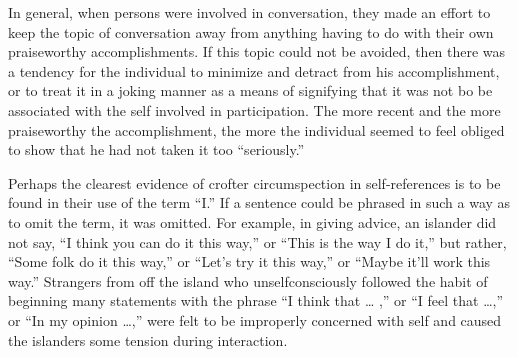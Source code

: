 \documentclass[twoside,symmetric,nobib,justified]{tufte-book}
\begin{document}
In general, when persons were involved in conversation, they made an
effort to keep the topic of conversation away from anything having to do
with their own praiseworthy accomplishments. If this topic could not be
avoided, then there was a tendency for the individual to minimize and
detract from his accomplishment, or to treat it in a joking manner as a
means of signifying that it was not bo be associated with the self
involved in participation. The more recent and the more praiseworthy the
accomplishment, the more the individual seemed to feel obliged to show
that he had not taken it too ``seriously.''

Perhaps the clearest evidence of crofter circumspection in
self-references is to be found in their use of the term ``I.'' If a
sentence could be phrased in such a way as to omit the term, it was
omitted. For example, in giving advice, an islander did not say, ``I
think you can do it this way,'' or ``This is the way I do it,'' but
rather, ``Some folk do it this way,'' or ``Let's try it this way,'' or
``Maybe it'll work this way.'' Strangers from off the island who
unselfconsciously followed the habit of beginning many statements with
the phrase ``I think that \ldots{} ,'' or ``I feel that \ldots,'' or
``In my opinion \ldots,'' were felt to be improperly concerned with self
and caused the islanders some tension during interaction.

\enlargethispage{\baselineskip}
\end{document}
